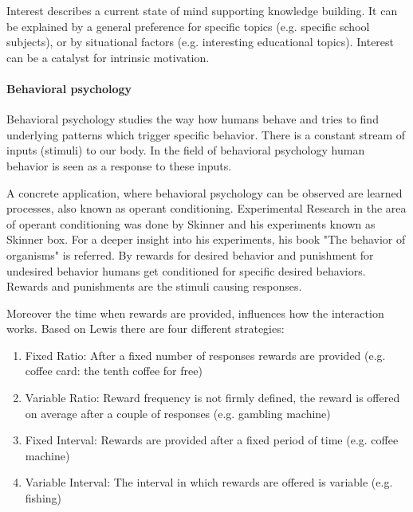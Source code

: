 Interest describes a current state of mind supporting knowledge building. It can be explained by a general preference for specific topics (e.g. specific school subjects), or by situational factors (e.g. interesting educational topics). Interest can be a catalyst for intrinsic motivation. \cite[p. 22, 23, 24]{bierhoffeditorEnzyklopaediePsychologieSoziale2016}

\paragraph*{Behavioral psychology}

Behavioral psychology studies the way how humans behave and tries to find underlying patterns which trigger specific behavior. There is a constant stream of inputs (stimuli) to our body. In the field of  behavioral psychology human behavior is seen as a response to these inputs. \cite[p. 10]{lewisIrresistibleAppsMotivational2014}

A concrete application, where behavioral psychology can be observed are learned processes, also known as operant conditioning. Experimental Research in the area of operant conditioning was done by Skinner and his experiments known as Skinner box. For a deeper insight into his experiments, his book "The behavior of organisms" \cite{skinnerBehaviorOrganisms1938} is referred. By rewards for desired behavior and punishment for undesired behavior humans get conditioned for specific desired behaviors. Rewards and punishments are the stimuli causing responses. \cite[p. 11]{lewisIrresistibleAppsMotivational2014}

Moreover the time when rewards are provided, influences how the interaction works.
Based on Lewis \cite[p. 10]{lewisIrresistibleAppsMotivational2014} there are four different strategies:
\begin{enumerate}
	\item Fixed Ratio: After a fixed number of responses rewards are provided (e.g. coffee card: the tenth coffee for free)
	\item Variable Ratio: Reward frequency is not firmly defined, the reward is offered on average after a couple of responses (e.g. gambling machine)
	\item Fixed Interval: Rewards are provided after a fixed period of time (e.g. coffee machine)
	\item Variable Interval: The interval in which rewards are offered is variable (e.g. fishing)
\end{enumerate}

